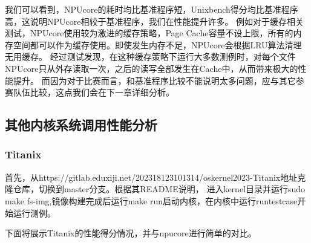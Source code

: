 我们可以看到，NPUcore的耗时均比基准程序短，Unixbench得分均比基准程序高，这说明NPUcore相较于基准程序，我们在性能提升许多。
例如对于缓存相关测试，NPUcore使用较为激进的缓存策略，Page Cache容量不设上限，所有的内存空间都可以作为缓存使用。即使发生内存不足，NPUcore会根据LRU算法清理无用缓存。
经过测试发现，在这种缓存策略下运行大多数测例时，对每个文件NPUcore只从外存读取一次，之后的读写全部发生在Cache中，从而带来极大的性能提升。
而因为对于比赛而言，和基准程序比较不能说明太多问题，应与其它参赛队伍比较，这点我们会在下一章详细分析。

\subsection{其他内核系统调用性能分析}


\subsubsection{Titanix}

首先，从https://gitlab.eduxiji.net/202318123101314/oskernel2023-Titanix地址克隆仓库，切换到master分支。根据其README说明，
进入kernel目录并运行sudo make fs-img,镜像构建完成后运行make run启动内核，在内核中运行runtestcase开始运行测例。

下面将展示Titanix的性能得分情况，并与npucore进行简单的对比。

